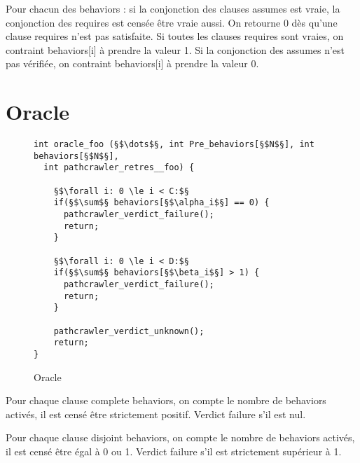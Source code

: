 Pour chacun des behaviors : si la conjonction des clauses assumes est vraie, la
conjonction des requires est censée être vraie aussi. On retourne 0 dès qu'une
clause requires n'est pas satisfaite. Si toutes les clauses requires sont
vraies, on contraint behaviors[i] à prendre la valeur 1.
Si la conjonction des assumes n'est pas vérifiée, on contraint behaviors[i] à
prendre la valeur 0.


\section{Oracle}


\begin{figure}[h]
  \begin{lstlisting}
int oracle_foo (§$\dots$§, int Pre_behaviors[§$N$§], int behaviors[§$N$§],
  int pathcrawler_retres__foo) {
  
    §$\forall i: 0 \le i < C:$§
    if(§$\sum$§ behaviors[§$\alpha_i$§] == 0) {
      pathcrawler_verdict_failure();
      return;
    }

    §$\forall i: 0 \le i < D:$§
    if(§$\sum$§ behaviors[§$\beta_i$§] > 1) {
      pathcrawler_verdict_failure();
      return;
    }

    pathcrawler_verdict_unknown();
    return;
}
  \end{lstlisting}
  \caption{Oracle}
\end{figure}

Pour chaque clause complete behaviors, on compte le nombre de behaviors
activés, il est censé être strictement positif. Verdict failure s'il est nul.

Pour chaque clause disjoint behaviors, on compte le nombre de behaviors
activés, il est censé être égal à 0 ou 1. Verdict failure s'il est strictement
supérieur à 1.
